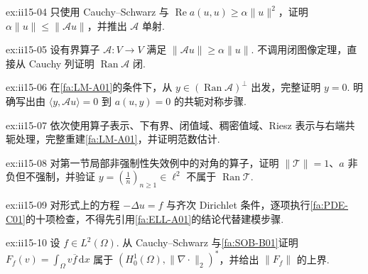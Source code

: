 \begin{FAExercise}[强制性推出下有界]{ex:ii15-04}
只使用 Cauchy--Schwarz 与 \(\displaystyle\operatorname{Re}a(u,u)\geqslant\alpha\|u\|^2\)，证明 \(\displaystyle\alpha\|u\|\leqslant\|\mathcal Au\|\)，并推出 \(\displaystyle\mathcal A\) 单射.
\end{FAExercise}

\begin{FAExercise}[闭值域]{ex:ii15-05}
设有界算子 \(\displaystyle\mathcal A:V\to V\) 满足 \(\displaystyle\|\mathcal Au\|\geqslant\alpha\|u\|\). 不调用闭图像定理，直接从 Cauchy 列证明 \(\displaystyle\operatorname{Ran}\mathcal A\) 闭.
\end{FAExercise}

\begin{FAExercise}[稠密值域]{ex:ii15-06}
在\autoref{fa:LM-A01}的条件下，从 \(\displaystyle y\in(\operatorname{Ran}\mathcal A)^\perp\) 出发，完整证明 \(\displaystyle y=0\). 明确写出由 \(\displaystyle\langle y,\mathcal Au\rangle=0\) 到 \(\displaystyle a(u,y)=0\) 的共轭对称步骤.
\end{FAExercise}

\begin{FAExercise}{ex:ii15-07}
依次使用算子表示、下有界、闭值域、稠密值域、Riesz 表示与右端共轭处理，完整重建\autoref{fa:LM-A01}，并证明范数估计.
\end{FAExercise}

\begin{FAExercise}[强制性失败的对角例]{ex:ii15-08}
对第一节局部非强制性失效例中的对角的算子，证明 \(\displaystyle\|\mathcal T\|=1\)、\(\displaystyle a\) 非负但不强制，并验证 \(\displaystyle y=(\frac{1}{n})_{n\geqslant1}\in\ell^2\) 不属于 \(\displaystyle\operatorname{Ran}\mathcal T\).
\end{FAExercise}

\begin{FAExercise}[弱偏微分方程建模核对表]{ex:ii15-09}
对形式上的方程 \(\displaystyle-\Delta u=f\) 与齐次 Dirichlet 条件，逐项执行\autoref{fa:PDE-C01}的十项检查，不得先引用\autoref{fa:ELL-A01}的结论代替建模步骤.
\end{FAExercise}

\begin{FAExercise}{ex:ii15-10}
设 \(\displaystyle f\in L^2(\Omega)\). 从 Cauchy--Schwarz 与\autoref{fa:SOB-B01}证明 \(\displaystyle F_f(v)=\int_\Omega v\overline f\,\mathrm{d}x\) 属于 \(\displaystyle(H_0^1(\Omega),\|\nabla\cdot\|_2)^*\)，并给出 \(\displaystyle\|F_f\|\) 的上界.
\end{FAExercise}

